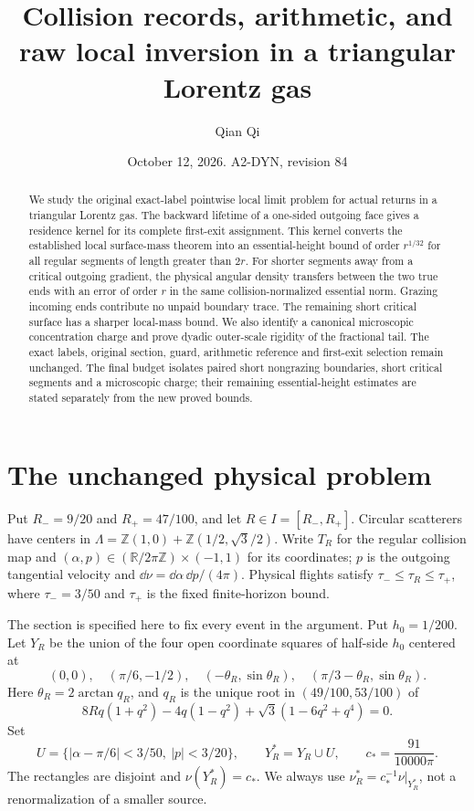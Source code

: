 \documentclass[11pt,reqno]{amsart}
\title[Collision records and raw local inversion]{Collision records, arithmetic, and raw local inversion in a triangular Lorentz gas}
\author{Qian Qi}
\date{October 12, 2026. A2-DYN, revision 84}
\numberwithin{equation}{section}
\theoremstyle{definition}
\theoremstyle{remark}\newtheorem{remark}[theorem]{Remark}
\newcommand{\R}{\mathbb R}\newcommand{\Z}{\mathbb Z}
\begin{document}
\raggedbottom
\begin{abstract}
We study the original exact-label pointwise local limit problem for
actual returns in a triangular Lorentz gas. The backward lifetime of
a one-sided outgoing face gives a residence kernel for its complete
first-exit assignment. This kernel converts the established local
surface-mass theorem into an essential-height bound of order
$r^{1/32}$ for all regular segments of length greater than $2r$.
For shorter segments away from a critical outgoing gradient, the
physical angular density transfers between the two true ends with
an error of order $r$ in the same collision-normalized essential norm.
Grazing incoming ends contribute no unpaid boundary trace. The
remaining short critical surface has a sharper local-mass bound.
We also identify a canonical microscopic concentration charge and
prove dyadic outer-scale rigidity of the fractional tail. The exact
labels, original section, guard, arithmetic reference and first-exit
selection remain unchanged. The final budget isolates paired short
nongrazing boundaries, short critical segments and a microscopic
charge; their remaining essential-height estimates are stated
separately from the new proved bounds.
\end{abstract}
\maketitle

\section{The unchanged physical problem}
Put $R_-=9/20$ and $R_+=47/100$, and let $R\in I=[R_-,R_+]$. Circular scatterers have centers in
$\Lambda=\Z(1,0)+\Z(1/2,\sqrt3/2)$. Write $T_R$ for the regular
collision map and $(\alpha,p)\in(\R/2\pi\Z)\times(-1,1)$ for its
coordinates; $p$ is the outgoing tangential velocity and
$\dd\nu=\dd\alpha\,\dd p/(4\pi)$. Physical flights satisfy
$\tau_-\le\tau_R\le\tau_+$, where $\tau_-=3/50$ and $\tau_+$
is the fixed finite-horizon bound.

The section is specified here to fix every event in the argument.
Put $h_0=1/200$. Let $Y_R$ be the union of the four open coordinate
squares of half-side $h_0$ centered at
\[
 (0,0),\quad(\pi/6,-1/2),\quad
 (-\theta_R,\sin\theta_R),\quad
 (\pi/3-\theta_R,\sin\theta_R).
\]
Here $\theta_R=2\arctan q_R$, and $q_R$ is the unique root in
$(49/100,53/100)$ of
\[
 8Rq(1+q^2)-4q(1-q^2)+\sqrt3(1-6q^2+q^4)=0.
\]
Set
\[
 U=\{|\alpha-\pi/6|<3/50,\ |p|<3/20\},\qquad
 Y_R^*=Y_R\cup U,\qquad c_*=\frac{91}{10000\pi}.
\]
The rectangles are disjoint and $\nu(Y_R^*)=c_*$. We always use
$\nu_R^*=c_*^{-1}\nu|_{Y_R^*}$, not a renormalization of a smaller
source.
\end{document}
